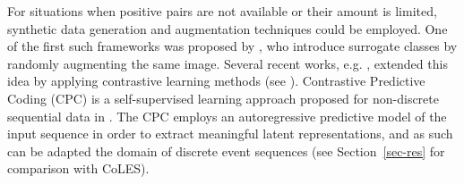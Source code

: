 \documentclass[sigconf, anonymous]{acmart}
\begin{document}
For situations when positive pairs are not available or their amount is limited, synthetic data
generation and augmentation techniques could be employed. One of the first such frameworks was
proposed by \citet{Dosovitskiy2014DiscriminativeUF}, who introduce surrogate classes by randomly
augmenting the same image. Several recent works, e.g. \citep{Bachman2019LearningRB,He2019MomentumCF,Chen2020ASF},
extended this idea by applying contrastive learning methods (see \citep{Falcon2020AFF}).
%
Contrastive Predictive Coding (CPC) is a self-supervised learning approach proposed for non-discrete
sequential data in \citep{Oord2018RepresentationLW}. The CPC employs an autoregressive predictive
model of the input sequence in order to extract meaningful latent representations, and as such
can be adapted the domain of discrete event sequences (see Section~\ref{sec-res} for comparison
with CoLES).


\end{document}
